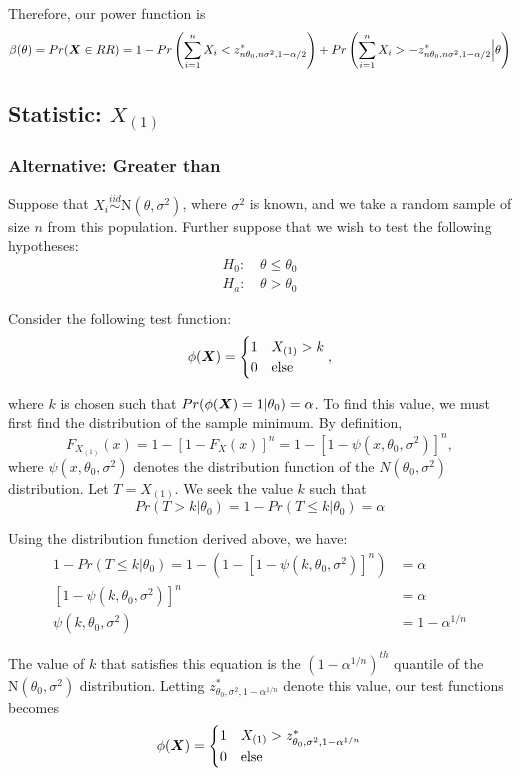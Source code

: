 \documentclass[]{article}
\newcommand{\bfX}{\mbox{\boldmath $X$}}
\begin{document}
Therefore, our power function is
\[
\beta(\theta) = Pr(\bfX \in RR) = 1 - Pr\left(\sum_{i=1}^n X_i < z^*_{n\theta_0, n\sigma^2, 1-\alpha/2}\right) +  Pr\left(\sum_{i=1}^n X_i > -z^*_{n\theta_0, n\sigma^2, 1-\alpha/2} \Big| \theta\right) 
\]


\subsection{Statistic: $X_{(1)}$}

\subsubsection{Alternative: Greater than}

Suppose that $X_i \stackrel{iid}{\sim} \text{N}(\theta, \sigma^2)$, where $\sigma^2$ is known, and we take a random sample of size $n$ from this population. Further suppose that we wish to test the following hypotheses:
\[
\begin{split}
\text{$H_0$: }& \theta \leq \theta_0 \\
\text{$H_a$: }& \theta > \theta_0
\end{split}
\]

Consider the following test function:
\[
\phi(\bfX) = \begin{cases}
1 & X_{(1)} > k \\
0 & \text{else}
\end{cases},
\]

where $k$ is chosen such that $Pr(\phi(\bfX) = 1|\theta_0) = \alpha$. To find this value, we must first find the distribution of the sample minimum. By definition,
\[
F_{X_{(1)}}(x) = 1 - [1 - F_X(x)]^n = 1 - [1 - \psi(x, \theta_0, \sigma^2)]^n,
\]
where $\psi(x, \theta_0, \sigma^2)$ denotes the distribution function of the $N(\theta_0, \sigma^2)$ distribution. Let $T = X_{(1)}$. We seek the value $k$ such that 
\[
Pr(T > k | \theta_0) = 1 - Pr(T \leq k | \theta_0) = \alpha
\]

Using the distribution function derived above, we have:
\[
\begin{split}
1 - Pr(T \leq k | \theta_0) = 1 - \left(1 - [1 - \psi(k, \theta_0, \sigma^2)]^n\right) &= \alpha \\
[1 - \psi(k, \theta_0, \sigma^2)]^n &= \alpha \\
\psi(k, \theta_0, \sigma^2) &= 1 - \alpha^{1/n}
\end{split}
\]

The value of $k$ that satisfies this equation is the $(1 - \alpha^{1/n})^{th}$ quantile of the $\text{N}(\theta_0, \sigma^2)$ distribution. Letting $z^*_{\theta_0, \sigma^2, 1-\alpha^{1/n}}$ denote this value, our test functions becomes
\[
\phi(\bfX) = \begin{cases}
1 & X_{(1)} > z^*_{\theta_0, \sigma^2, 1-\alpha^{1/n}} \\
0 & \text{else}
\end{cases}
\]
\end{document}
